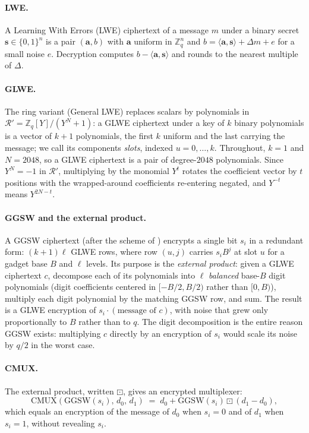 \documentclass[11pt]{article}
\newcommand{\ZZ}{\mathbb{Z}}
\newcommand{\tring}{\mathcal{R}'}
\newcommand{\inner}[2]{\langle #1, #2 \rangle}
\begin{document}
\paragraph{LWE.} A Learning With Errors (LWE) ciphertext of a message $m$ under a binary secret $\mathbf{s} \in \{0,1\}^n$ is a pair $(\mathbf{a}, b)$ with $\mathbf{a}$ uniform in $\ZZ_q^n$ and $b = \inner{\mathbf{a}}{\mathbf{s}} + \Delta m + e$ for a small noise $e$. Decryption computes $b - \inner{\mathbf{a}}{\mathbf{s}}$ and rounds to the nearest multiple of $\Delta$.

\paragraph{GLWE.} The ring variant (General LWE) replaces scalars by polynomials in $\tring = \ZZ_q[Y]/(Y^N + 1)$: a GLWE ciphertext under a key of $k$ binary polynomials is a vector of $k + 1$ polynomials, the first $k$ uniform and the last carrying the message; we call its components \emph{slots}, indexed $u = 0, \dots, k$. Throughout, $k = 1$ and $N = 2048$, so a GLWE ciphertext is a pair of degree-$2048$ polynomials. Since $Y^N = -1$ in $\tring$, multiplying by the monomial $Y^t$ rotates the coefficient vector by $t$ positions with the wrapped-around coefficients re-entering negated, and $Y^{-t}$ means $Y^{2N - t}$.

\paragraph{GGSW and the external product.} A GGSW ciphertext (after the scheme of \cite{ggsw}) encrypts a single bit $s_i$ in a redundant form: $(k+1)\ell$ GLWE rows, where row $(u, j)$ carries $s_i B^j$ at slot $u$ for a gadget base $B$ and $\ell$ levels. Its purpose is the \emph{external product}: given a GLWE ciphertext $c$, decompose each of its polynomials into $\ell$ \emph{balanced} base-$B$ digit polynomials (digit coefficients centered in $[-B/2, B/2)$ rather than $[0, B)$), multiply each digit polynomial by the matching GGSW row, and sum. The result is a GLWE encryption of $s_i \cdot (\text{message of } c)$, with noise that grew only proportionally to $B$ rather than to $q$. The digit decomposition is the entire reason GGSW exists: multiplying $c$ directly by an encryption of $s_i$ would scale its noise by $q/2$ in the worst case.

\paragraph{CMUX.} The external product, written $\boxdot$, gives an encrypted multiplexer:
\[
  \mathrm{CMUX}(\mathrm{GGSW}(s_i),\, d_0,\, d_1) \;=\; d_0 + \mathrm{GGSW}(s_i) \boxdot (d_1 - d_0),
\]
which equals an encryption of the message of $d_0$ when $s_i = 0$ and of $d_1$ when $s_i = 1$, without revealing $s_i$.
\end{document}
